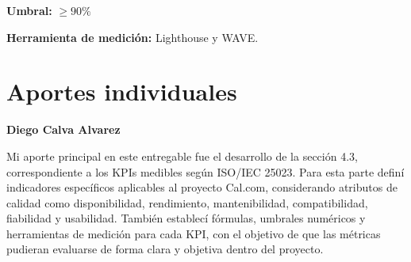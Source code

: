 \documentclass[12pt]{article}
\begin{document}
\textbf{Umbral:} $\geq 90\%$

\textbf{Herramienta de medición:} Lighthouse y WAVE.

\newpage

\section{Aportes individuales}

\textbf{Diego Calva Alvarez}

Mi aporte principal en este entregable fue el desarrollo de la sección 4.3, correspondiente a los KPIs medibles según ISO/IEC 25023. Para esta parte definí indicadores específicos aplicables al proyecto Cal.com, considerando atributos de calidad como disponibilidad, rendimiento, mantenibilidad, compatibilidad, fiabilidad y usabilidad. También establecí fórmulas, umbrales numéricos y herramientas de medición para cada KPI, con el objetivo de que las métricas pudieran evaluarse de forma clara y objetiva dentro del proyecto.

\newpage

\nocite{ieee730}



\end{document}
